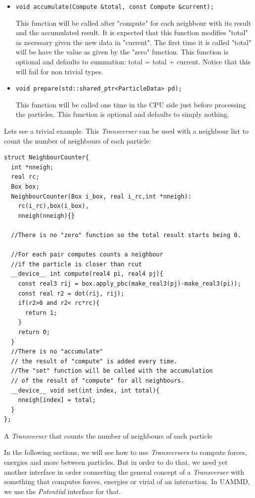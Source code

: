 \documentclass[ twoside,openright,titlepage,numbers=noenddot,%
headinclude,footinclude,cleardoublepage=empty,abstract=on,
BCOR=5mm,paper=a4,fontsize=11pt, dvipsnames
]{scrreprt}
\def\ucpp{uammd_cpp_lexer.py:UAMMDCppLexer -x}
\newcommand{\uammd}{\gls{UAMMD}\xspace}
\begin{document}
\begin{itemize}
 \item \texttt{void accumulate(Compute &total, const Compute &current);}

   
  This function will be called after "compute" for each neighbour with its result and the accumulated result.
  It is expected that this function modifies "total" as necessary given the new data in "current".
  The first time it is called "total" will be have the value as given by the "zero" function.
  This function is optional and defaults to summation: total = total + current. Notice that this will fail for non trivial types.
     
\item \texttt{void prepare(std::shared_ptr<ParticleData> pd);}

  
  This function will be called one time in the CPU side just before processing the particles.
  This function is optional and defaults to simply nothing.
 \end{itemize}

Lets see a trivial example.
This \emph{Transverser} can be used with a neighbour list to count the number of neighbours of each particle:
\begin{listing}
\begin{verbatim}
struct NeighbourCounter{
  int *nneigh;
  real rc;
  Box box;
  NeighbourCounter(Box i_box, real i_rc,int *nneigh):
    rc(i_rc),box(i_box),
    nneigh(nneigh){}

  //There is no "zero" function so the total result starts being 0.
  
  //For each pair computes counts a neighbour 
  //if the particle is closer than rcut
  __device__ int compute(real4 pi, real4 pj){
    const real3 rij = box.apply_pbc(make_real3(pj)-make_real3(pi));
    const real r2 = dot(rij, rij);
    if(r2>0 and r2< rc*rc){
      return 1;
    }
    return 0;
  }
  //There is no "accumulate"
  // the result of "compute" is added every time.
  //The "set" function will be called with the accumulation
  // of the result of "compute" for all neighbours. 
  __device__ void set(int index, int total){
    nneigh[index] = total;
  }
};
\end{verbatim}
\caption{A \emph{Transverser} that counts the number of neighbours of each particle}
\label{code:ncounter}
\end{listing}
In the following sections, we will see how to use \emph{Transversers} to compute forces, energies and more between particles.
But in order to do that, we need yet another interface in order connecting the general concept of a \emph{Transverser} with something that computes forces, energies or virial of an interaction. In \uammd, we use the \emph{Potential} interface for that.
\end{document}
